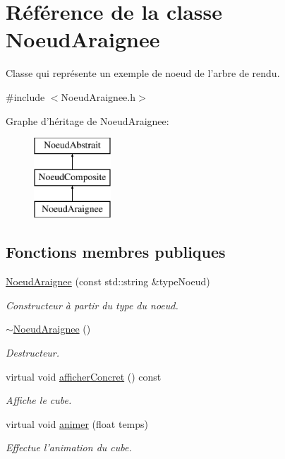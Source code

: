 \hypertarget{class_noeud_araignee}{\section{Référence de la classe Noeud\-Araignee}
\label{class_noeud_araignee}
}


Classe qui représente un exemple de noeud de l'arbre de rendu.  




{\ttfamily \#include $<$Noeud\-Araignee.\-h$>$}

Graphe d'héritage de Noeud\-Araignee\-:\begin{figure}[H]
\begin{center}
\leavevmode
\includegraphics[height=3.000000cm]{class_noeud_araignee}
\end{center}
\end{figure}
\subsection*{Fonctions membres publiques}
\begin{DoxyCompactItemize}
\item 
\hyperlink{group__inf2990_ga0ca3d14d5baf9c6879ac53918cc54ba5}{Noeud\-Araignee} (const std\-::string \&type\-Noeud)
\begin{DoxyCompactList}\small\item\em Constructeur à partir du type du noeud. \end{DoxyCompactList}\item 
\hyperlink{group__inf2990_ga78bf0250c601da26edb8cd8f2cddec10}{$\sim$\-Noeud\-Araignee} ()
\begin{DoxyCompactList}\small\item\em Destructeur. \end{DoxyCompactList}\item 
virtual void \hyperlink{group__inf2990_ga4f9e7fbb424a0cb18e01ab12a092fc02}{afficher\-Concret} () const 
\begin{DoxyCompactList}\small\item\em Affiche le cube. \end{DoxyCompactList}\item 
\hypertarget{group__inf2990_gae3f4c490330d597a18975014c06a05ca}{virtual void \hyperlink{group__inf2990_gae3f4c490330d597a18975014c06a05ca}{animer} (float temps)}\label{group__inf2990_gae3f4c490330d597a18975014c06a05ca}

\begin{DoxyCompactList}\small\item\em Effectue l'animation du cube. \end{DoxyCompactList}\end{DoxyCompactItemize}
